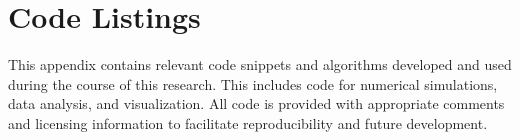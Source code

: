 \chapter{Code Listings}
\label{chap:appendix-b}
This appendix contains relevant code snippets and algorithms developed and used during the course of this research. This includes code for numerical simulations, data analysis, and visualization. All code is provided with appropriate comments and licensing information to facilitate reproducibility and future development.
\blindtext[2] %
